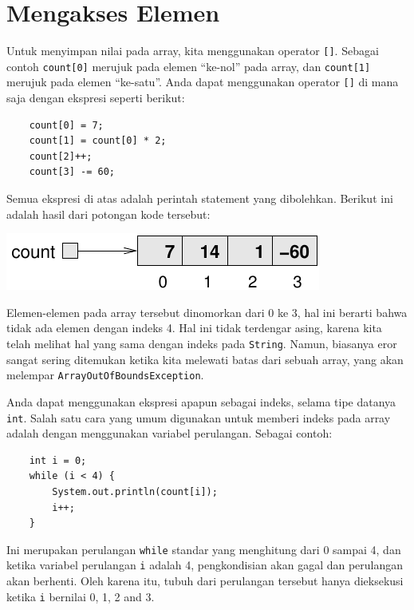 \section{Mengakses Elemen}

Untuk menyimpan nilai pada array, kita menggunakan operator 
{\tt []}.  Sebagai contoh {\tt count[0]} merujuk pada elemen
``ke-nol'' pada array, dan {\tt count[1]} merujuk pada elemen
``ke-satu''.  Anda dapat menggunakan operator {\tt []} di mana saja dengan ekspresi seperti berikut:

\begin{lstlisting}
    count[0] = 7;
    count[1] = count[0] * 2;
    count[2]++;
    count[3] -= 60;
\end{lstlisting}
%
Semua ekspresi di atas adalah perintah statement yang dibolehkan. Berikut ini adalah hasil dari potongan kode tersebut:


\includegraphics{array2.pdf}


Elemen-elemen pada array tersebut dinomorkan dari 0 ke 3, hal ini berarti bahwa tidak ada elemen dengan indeks 4.  Hal ini tidak terdengar asing, karena kita telah melihat hal yang sama dengan 
indeks pada {\tt String}.  Namun, biasanya eror sangat sering ditemukan ketika kita melewati batas dari sebuah array, yang akan melempar 
{\tt ArrayOutOfBoundsException}.

Anda dapat menggunakan ekspresi apapun sebagai indeks, selama tipe datanya {\tt
int}. Salah satu cara yang umum digunakan untuk memberi indeks pada array adalah dengan menggunakan variabel perulangan. Sebagai contoh:

\begin{lstlisting}
    int i = 0;
    while (i < 4) {
        System.out.println(count[i]);
        i++;
    }
\end{lstlisting}
%
Ini merupakan perulangan {\tt while} standar yang menghitung dari 0 sampai 4, dan ketika variabel perulangan {\tt i} adalah 4, pengkondisian akan gagal dan perulangan akan berhenti.  Oleh karena itu, tubuh dari perulangan tersebut hanya dieksekusi ketika {\tt i} bernilai 0, 1, 2 and 3.


